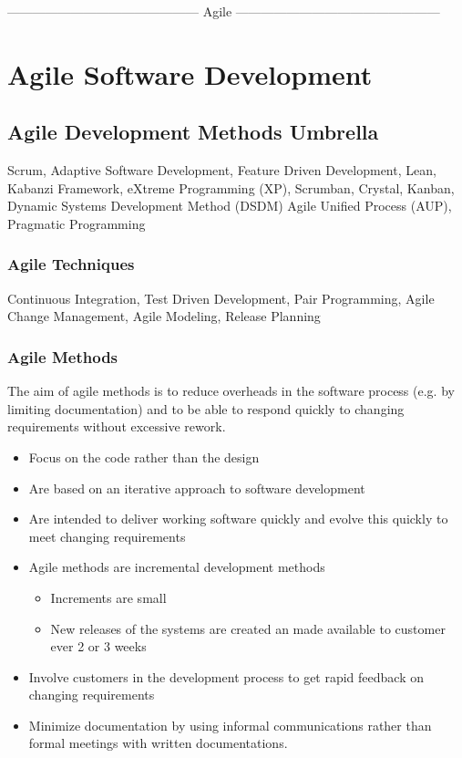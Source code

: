 \documentclass{report}
\begin{document}
--------------------------------------------- Agile ------------------------------------------------
\chapter{Agile Software Development} 
\section{Agile Development Methods Umbrella}
\noindent Scrum, Adaptive Software Development, Feature Driven Development, Lean, Kabanzi Framework, eXtreme Programming (XP), Scrumban, Crystal, Kanban, Dynamic Systems Development Method (DSDM) Agile Unified Process (AUP), Pragmatic Programming

\subsection{Agile Techniques}
\noindent Continuous Integration, Test Driven Development, Pair Programming, Agile Change Management, Agile Modeling, Release Planning

\subsection{Agile Methods}
\noindent The aim of agile methods is to reduce overheads in the software process (e.g. by limiting documentation) and to be able to respond quickly to changing requirements without excessive rework.
\begin{itemize}
  \item Focus on the code rather than the design
  \item Are based on an iterative approach to software development
  \item Are intended to deliver working software quickly and evolve this quickly to meet changing requirements
  \item Agile methods are incremental development methods
  \begin{itemize}
    \item Increments are small
    \item New releases of the systems are created an made available to customer ever 2 or 3 weeks
  \end{itemize}
  \item Involve customers in the development process to get rapid feedback on changing requirements
  \item Minimize documentation by using informal communications rather than formal meetings with written documentations.
\end{itemize}
\end{document}
